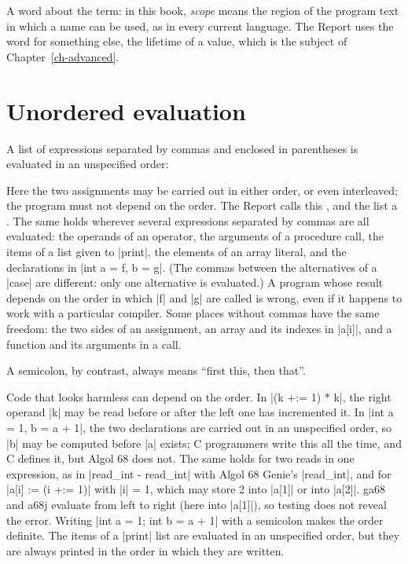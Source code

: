 A word about the term: in this book, \emph{scope} means the region of the
program text in which a name can be used, as in every current language.
The Report uses the word  for something else, the lifetime of a
value, which is the subject of Chapter~\ref{ch-advanced}.

\section{Unordered evaluation}\label{sec-collateral}

A list of expressions separated by commas and enclosed in parentheses is
evaluated in an unspecified order:


Here the two assignments may be carried out in either order, or even
interleaved; the program must not depend on the order. The Report calls
this , and the list a .
The same holds wherever several expressions separated by commas are all
evaluated: the operands of an operator, the arguments of a procedure
call, the items of a list given to \code|print|, the elements of an array
literal, and the declarations in \code|int a = f, b = g|. (The commas
between the alternatives of a \code|case| are different: only one
alternative is evaluated.) A program
whose result depends on the order in which \code|f| and \code|g| are
called is wrong, even if it happens to work with a particular compiler.
Some places without commas have the same freedom: the two sides of an
assignment, an array and its indexes in \code|a[i]|, and a function and
its arguments in a call.

A semicolon, by contrast, always means ``first this, then that''.

\begin{pitfall}
Code that looks harmless can depend on the order. In
\code|(k +:= 1) * k|, the right operand \code|k| may be read before or
after the left one has incremented it. In \code|int a = 1, b = a + 1|,
the two declarations are carried out in an unspecified order, so
\code|b| may be computed before \code|a| exists; C programmers write this
all the time, and C defines it, but Algol 68 does not. The same holds for
two reads in one expression, as in \code|read_int - read_int| with
Algol 68 Genie's \code|read_int|, and for
\code|a[i] := (i +:= 1)| with \code|i| = 1, which may store 2 into
\code|a[1]| or into \code|a[2]|. ga68 and a68j evaluate from left to
right (here into \code|a[1]|), so testing does not reveal the error. Writing \code|int a = 1; int b = a + 1| with
a semicolon makes the order definite. The items of a \code|print| list
are evaluated in an unspecified order, but they are always printed in
the order in which they are written.
\end{pitfall}

